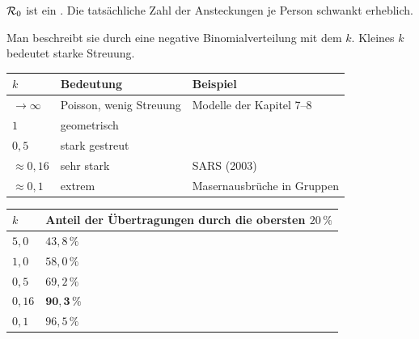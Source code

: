 \begin{merksatz}
$\mathcal{R}_0$ ist ein . Die tatsächliche Zahl der Ansteckungen je Person schwankt erheblich.

\begin{center}
\begin{minipage}{0.9\textwidth}
Man beschreibt sie durch eine negative Binomialverteilung mit dem  $k$. Kleines $k$ bedeutet starke Streuung.
\end{minipage}
\end{center}

\begin{center}
{\small
\renewcommand{\arraystretch}{1.48}
\begin{tabular}{@{}P{1.6cm}P{2.8cm}P{3.4cm}@{}}
\toprule
$k$ & \textbf{Bedeutung} & \textbf{Beispiel}\\
\midrule
$\to\infty$ & Poisson, wenig Streuung & Modelle der Kapitel 7--8\\
$1$ & geometrisch & \\
$0{,}5$ & stark gestreut & \\
$\approx 0{,}16$ & sehr stark & SARS (2003)\\
$\approx 0{,}1$ & extrem & Masernausbrüche in Gruppen\\
\bottomrule
\end{tabular}}
\end{center}

\begin{center}
{\small
\renewcommand{\arraystretch}{1.48}
\begin{tabular}{@{}P{1.6cm}P{4.4cm}@{}}
\toprule
$k$ & \textbf{Anteil der Übertragungen durch die obersten $20\,\%$}\\
\midrule
$5{,}0$ & $43{,}8\,\%$\\
$1{,}0$ & $58{,}0\,\%$\\
$0{,}5$ & $69{,}2\,\%$\\
$0{,}16$ & $\mathbf{90{,}3\,\%}$\\
$0{,}1$ & $96{,}5\,\%$\\
\bottomrule
\end{tabular}}
\end{center}

\begin{center}
\begin{minipage}{0.88\textwidth}
\end{minipage}
\end{center}
\end{merksatz}

